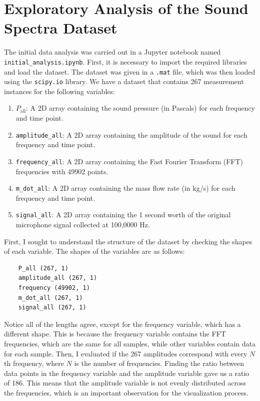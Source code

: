 \section{Exploratory Analysis of the Sound Spectra Dataset}\label{exploratory_analysis}
The initial data analysis was carried out in a Jupyter notebook named \verb|initial_analysis.ipynb|.
First, it is necessary to import the required libraries and load the dataset. The dataset 
was given in a \verb|.mat| file, which was then loaded using the \verb|scipy.io| library. 
We have a dataset that contains 267 measurement instances for the following variables: 
\begin{enumerate}
    \item \(P_\text{all}\): A 2D array containing the sound pressure (in Pascals) 
    for each frequency and time point. 
    \item \verb|amplitude_all|: A 2D array containing the amplitude of the sound for each 
    frequency and time point. 
    \item \verb|frequency_all|: A 2D array containing the Fast Fourier Transform (FFT) 
    frequencies with 49902 points. 
    \item \verb|m_dot_all|: A 2D array containing the mass flow rate (in kg/s) for each 
    frequency and time point.
    \item \verb|signal_all|: A 2D array containing the 1 second worth of the original 
    microphone signal collected at 100,0000 Hz.
\end{enumerate}

First, I sought to understand the structure of the dataset by checking the shapes of 
each variable. The shapes of the variables are as follows:

\begin{verbatim}
    P_all (267, 1)
    amplitude_all (267, 1)
    frequency (49902, 1)
    m_dot_all (267, 1)
    signal_all (267, 1)
\end{verbatim}

Notice all of the lengths agree, except for the frequency variable, which has a different 
shape. This is because the frequency variable contains the FFT frequencies, which are 
the same for all samples, while other variables contain data for each sample. Then, I 
evaluated if the 267 amplitudes correspond with every \(N\)th frequency, where \(N\) is 
the number of frequencies. Finding the ratio between data points in the frequency 
variable and the amplitude variable gave us a ratio of 186. This means that the 
amplitude variable is not evenly distributed across the frequencies, which is an 
important observation for the visualization process.  

